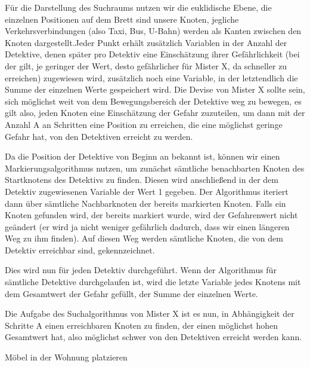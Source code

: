 \documentclass[ngerman]{fbi-aufgabenblatt}
\begin{document}

Für die Darstellung des Suchraums nutzen wir die euklidische Ebene, die einzelnen Positionen auf dem Brett sind unsere Knoten, jegliche Verkehrsverbindungen (also Taxi, Bus, U-Bahn) werden als Kanten zwischen den Knoten dargestellt.Jeder Punkt erhält zusätzlich Variablen in der Anzahl der Detektive, denen später pro Detektiv eine Einschätzung ihrer Gefährlichkeit (bei der gilt, je geringer der Wert, desto gefährlicher für Mister X, da schneller zu erreichen) zugewiesen wird, zusätzlich noch eine Variable, in der letztendlich die Summe der einzelnen Werte gespeichert wird. Die Devise von Mister X sollte sein, sich möglichst weit von dem Bewegungsbereich der Detektive weg zu bewegen, es gilt also, jeden Knoten eine Einschätzung der Gefahr zuzuteilen, um dann mit der Anzahl A an Schritten eine Position zu erreichen, die eine möglichst geringe Gefahr hat, von den Detektiven erreicht zu werden.

Da die Position der Detektive von Beginn an bekannt ist, können wir einen Markierungsalgorithmus nutzen, um zunächst sämtliche benachbarten Knoten des Startknotens des Detektivs zu finden. Diesen wird anschließend in der dem Detektiv zugewiesenen Variable der Wert 1 gegeben. Der Algorithmus iteriert dann über sämtliche Nachbarknoten der bereits markierten Knoten. Falls ein Knoten gefunden wird, der bereits markiert wurde, wird der Gefahrenwert nicht geändert (er wird ja nicht weniger gefährlich dadurch, dass wir einen längeren Weg zu ihm finden). Auf diesen Weg werden sämtliche Knoten, die von dem Detektiv erreichbar sind, gekennzeichnet.

Dies wird nun für jeden Detektiv durchgeführt. Wenn der Algorithmus für sämtliche Detektive durchgelaufen ist, wird die letzte Variable jedes Knotens mit dem Gesamtwert der Gefahr gefüllt, der Summe der einzelnen Werte.

Die Aufgabe des Suchalgorithmus von Mister X ist es nun, in Abhängigkeit der Schritte A einen erreichbaren Knoten zu finden, der einen möglichst hohen Gesamtwert hat, also möglichst schwer von den Detektiven erreicht werden kann.


Möbel in der Wohnung platzieren
\end{document}
